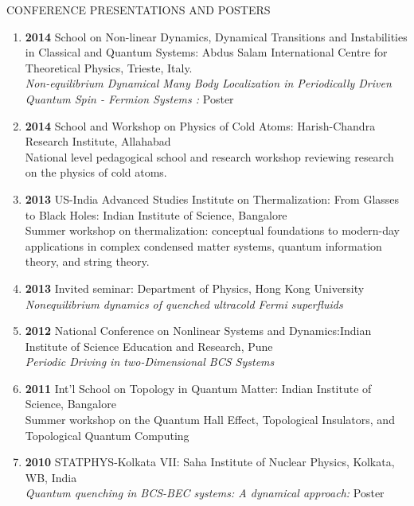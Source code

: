 \documentclass[a4paper,11pt]{article}
\begin{document}
  \begin{CVstuff}{CONFERENCE PRESENTATIONS AND POSTERS}
  \end{CVstuff}
\begin{enumerate}
\item
{\bf 2014} School on Non-linear Dynamics, Dynamical Transitions and Instabilities in Classical and Quantum Systems: Abdus Salam International Centre for Theoretical Physics, Trieste, Italy.\\
{\it Non-equilibrium Dynamical Many Body Localization in Periodically Driven Quantum Spin - Fermion Systems :} Poster \\

\item
{\bf 2014} School and Workshop on Physics of Cold Atoms: {Harish-Chandra Research Institute, Allahabad}\\
National level pedagogical school and research workshop reviewing research on the physics of cold atoms.\\

\item
{\bf 2013} US-India Advanced Studies Institute on Thermalization: From Glasses to Black Holes: {Indian Institute of Science, Bangalore}\\
Summer workshop on thermalization: conceptual foundations to modern-day applications in complex condensed matter systems, quantum information theory, and string theory.\\

\item
{\bf 2013} Invited seminar: Department of Physics, Hong Kong University \\
{\it Nonequilibrium dynamics of quenched ultracold Fermi superfluids}\\

\item
{\bf 2012} National Conference on Nonlinear Systems and Dynamics:{Indian Institute of Science Education and Research, Pune}\\
{\it Periodic Driving in two-Dimensional BCS Systems}\\

\item
{\bf 2011} Int'l School on Topology in Quantum Matter: {Indian Institute of Science, Bangalore}\\
Summer workshop on the Quantum Hall Effect, Topological Insulators, and Topological Quantum Computing \\

\item
{\bf 2010} STATPHYS-Kolkata VII: \hfill {Saha Institute of Nuclear Physics, Kolkata, WB, India}\\
{\it Quantum quenching in BCS-BEC systems: A dynamical approach:} Poster \\


\end{enumerate}
\end{document}
